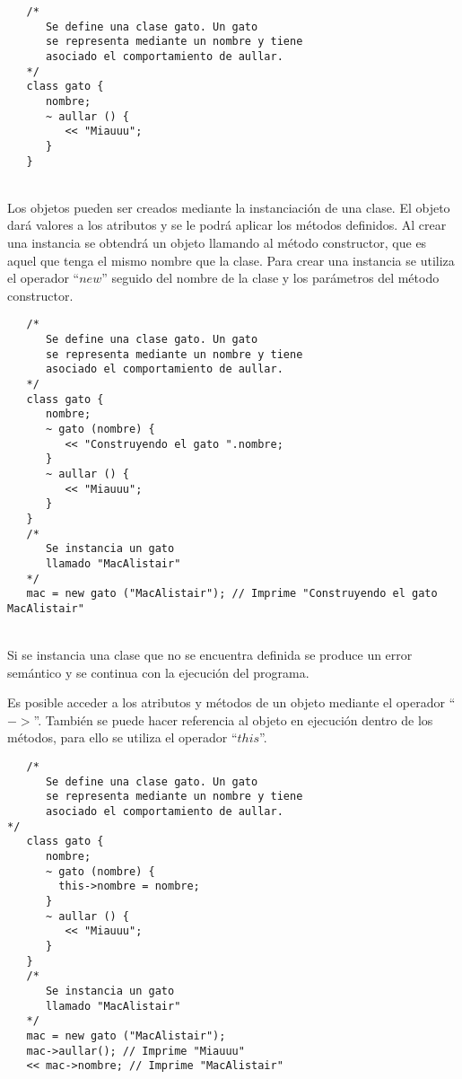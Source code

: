 \begin{lstlisting}
   /*
      Se define una clase gato. Un gato 
      se representa mediante un nombre y tiene
      asociado el comportamiento de aullar.
   */
   class gato {
      nombre;
      ~ aullar () {
         << "Miauuu";
      }
   }
\end{lstlisting}
\hfill\\ 

Los objetos pueden ser creados mediante la instanciación de una clase. El objeto dará valores
a los atributos y se le podrá aplicar los métodos definidos. Al crear una instancia se 
obtendrá un objeto llamando al método constructor, que es aquel que tenga el mismo nombre que la clase. 
Para crear una instancia se utiliza el operador ``$new$'' seguido del nombre de la clase y los parámetros 
del método constructor. \\ 

\begin{lstlisting}
   /*
      Se define una clase gato. Un gato 
      se representa mediante un nombre y tiene
      asociado el comportamiento de aullar.
   */
   class gato {
      nombre;
      ~ gato (nombre) {
         << "Construyendo el gato ".nombre;
      }
      ~ aullar () {
         << "Miauuu";
      }
   }
   /*
      Se instancia un gato 
      llamado "MacAlistair"
   */
   mac = new gato ("MacAlistair"); // Imprime "Construyendo el gato MacAlistair"
\end{lstlisting}
\hfill\\ 

Si se instancia una clase que no se encuentra definida se produce un error semántico y se continua con la ejecución del programa.

Es posible acceder a los atributos y métodos de un objeto mediante el operador ``$->$''.
También se puede hacer referencia al objeto en ejecución dentro de los métodos, para ello se utiliza el operador ``$this$''. \\

\begin{lstlisting}
   /*
      Se define una clase gato. Un gato 
      se representa mediante un nombre y tiene
      asociado el comportamiento de aullar.
*/
   class gato {
      nombre;
      ~ gato (nombre) {
        this->nombre = nombre;
      }
      ~ aullar () {
         << "Miauuu";
      }
   }
   /*
      Se instancia un gato 
      llamado "MacAlistair"
   */
   mac = new gato ("MacAlistair"); 
   mac->aullar(); // Imprime "Miauuu"
   << mac->nombre; // Imprime "MacAlistair"
\end{lstlisting}
\hfill\\ 

